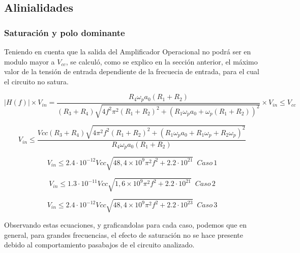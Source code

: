 \subsection{Alinialidades}

\subsubsection{Saturación y polo dominante}

Teniendo en cuenta que la salida del Amplificador Operacional no podrá
ser en modulo mayor a $V_{cc}$, se calculó, como se explico en la
sección anterior, el máximo valor de la tensión de entrada dependiente
de la frecuecia de entrada, para el cual el circuito no satura.

\[
\left|H(f)\right|\times V_{in}=\frac{R_{4}\omega_{p}a_{0}\left(R_{1}+R_{2}\right)}{\left(R_{3}+R_{4}\right)\sqrt{4f^{2}\pi^{2}\left(R_{1}+R_{2}\right)^{2}+\left(R_{1}\omega_{p}a_{0}+\omega_{p}\left(R_{1}+R_{2}\right)\right)^{2}}}\times V_{in}\leq V_{cc}
\]

\[
V_{in}\leq\frac{Vcc\left(R_{3}+R_{4}\right)\sqrt{4\pi^{2}f^{2}\left(R_{1}+R_{2}\right)^{2}+\left(R_{1}\omega_{p}a_{0}+R_{1}\omega_{p}+R_{2}\omega_{p}\right)^{2}}}{R_{4}\omega_{p}a_{0}\left(R_{1}+R_{2}\right)}
\]

\[
V_{in}\leq2.4\cdot10^{-12}Vcc\sqrt{48,4\times10^{9}\pi^{2}f^{2}+2.2\cdot10^{21}}\,\,\,Caso\,1
\]

\[
V_{in}\leq1.3\cdot10^{-11}Vcc\sqrt{1,6\times10^{9}\pi^{2}f^{2}+2.2\cdot10^{21}}\,\,\,Caso\,2
\]

\[
V_{in}\leq2.4\cdot10^{-12}Vcc\sqrt{48,4\times10^{9}\pi^{2}f^{2}+2.2\cdot10^{23}}\,\,\,Caso\,3
\]

Observando estas ecuaciones, y graficandolas para cada caso, podemos
que en general, para grandes frecuencias, el efecto de saturación
no se hace presente debido al comportamiento pasabajos de el circuito
analizado.

